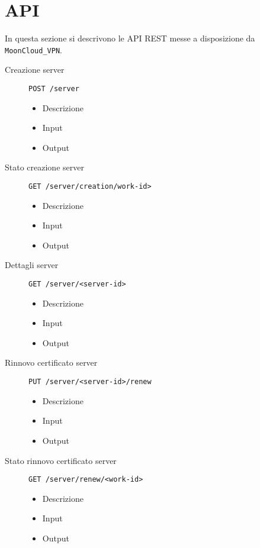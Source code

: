 \section{API}
In questa sezione si descrivono le API REST messe a disposizione da \texttt{MoonCloud\_VPN}.

\begin{description}
    \item[Creazione server]\texttt{POST /server}
    \begin{itemize}
        \item Descrizione
        \item Input
        \item Output
    \end{itemize}

    \item[Stato creazione server]\texttt{GET /server/creation/work-id>}
    \begin{itemize}
        \item Descrizione
        \item Input
        \item Output
    \end{itemize}

    \item[Dettagli server]\texttt{GET /server/<server-id>}
    \begin{itemize}
        \item Descrizione
        \item Input
        \item Output
    \end{itemize}

    \item[Rinnovo certificato server]\texttt{PUT /server/<server-id>/renew}
    \begin{itemize}
        \item Descrizione
        \item Input
        \item Output
    \end{itemize}

    \item[Stato rinnovo certificato server]\texttt{GET /server/renew/<work-id>}
    \begin{itemize}
        \item Descrizione
        \item Input
        \item Output
    \end{itemize}


\end{description}
